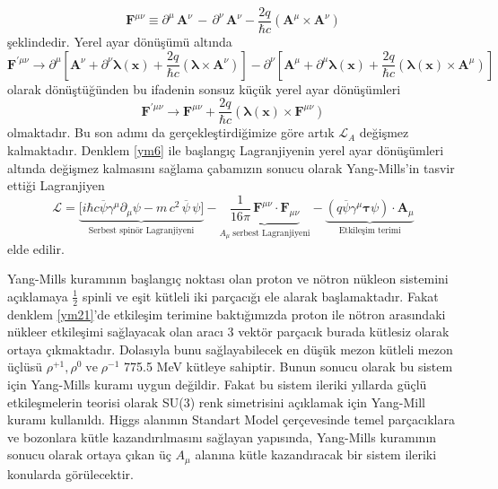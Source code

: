 \begin{equation} \label{ym18}
\mathbf{F}^{\mu\nu} \equiv \partial^{\mu}\,\mathbf{A}^{\nu}\,  - \, \partial^{\nu}\,\mathbf{A}^{\nu} -\frac{2q}{\hbar c}(\mathbf{A}^{\mu} \times \mathbf{A}^{\nu})
\end{equation}
şeklindedir. Yerel ayar dönüşümü altında 
\begin{equation} \label{ym19}
\mathbf{F}^{' \mu\nu} \to \partial^{\mu}\left[\mathbf{A}^{\nu} + \partial^{\nu}\boldsymbol{\lambda(x)} + \frac{2q}{\hbar c}(\boldsymbol{\lambda} \times \mathbf{A}^{\nu})\right] - \partial^{\nu} \left[ \mathbf{A}^{\mu} + \partial^{\mu}\boldsymbol{\lambda(x)} + \frac{2q}{\hbar c}(\boldsymbol{\lambda(x)} \times \mathbf{A}^{\mu})\right]
\end{equation}
olarak dönüştüğünden bu ifadenin sonsuz küçük yerel ayar dönüşümleri 
\begin{equation} \label{ym20}
\mathbf{F}^{' \mu\nu} \to \mathbf{F}^{\mu\nu} + \frac{2q}{\hbar c}(\boldsymbol{\lambda(x)} \times \mathbf{F}^{\mu\nu})
\end{equation}
olmaktadır. Bu son adımı da gerçekleştirdiğimize göre artık $\mathcal{L}_{A}$ değişmez kalmaktadır. Denklem \ref{ym6} ile başlangıç Lagranjiyenin yerel ayar dönüşümleri altında değişmez kalmasını sağlama çabamızın sonucu olarak  Yang-Mills'in tasvir ettiği Lagranjiyen 
\begin{equation} \label{ym21}
\mathcal{L} = \underbrace{ \big[ i\hbar c\overline{\psi}\gamma^{\mu}\partial_{\mu} \psi - m\,c^{2}\,\overline{\psi}\,\psi \big]}_{\textrm{Serbest spinör Lagranjiyeni}} -\underbrace{ \frac{1}{16\pi}\,\mathbf{F}^{\mu\nu}\cdot \mathbf{F}_{\mu\nu} }_{A_{\mu}\;\textrm{serbest Lagranjiyeni}}  - \underbrace{ (q\overline{\psi}\gamma^{\mu}\boldsymbol{\tau}\psi)\cdot\mathbf{A}_{\mu} }_{\textrm{Etkileşim terimi}}
\end{equation}
elde edilir.\par
Yang-Mills kuramının başlangıç noktası olan proton ve nötron  nükleon sistemini açıklamaya $\frac{1}{2}$ spinli ve eşit kütleli iki parçacığı ele alarak başlamaktadır. Fakat denklem \ref{ym21}'de etkileşim terimine baktığımızda proton ile nötron arasındaki nükleer etkileşimi sağlayacak olan aracı 3 vektör parçacık burada kütlesiz olarak ortaya çıkmaktadır. Dolasıyla bunu sağlayabilecek en düşük mezon kütleli mezon üçlüsü  $\rho^{+1},\rho^{0}\; \textrm{ve}\;\rho^{-1}$ 775.5 MeV kütleye sahiptir. Bunun sonucu olarak bu sistem için Yang-Mills kuramı uygun değildir. Fakat bu sistem ileriki yıllarda güçlü etkileşmelerin teorisi olarak SU(3) renk simetrisini açıklamak için Yang-Mill kuramı kullanıldı. Higgs alanının Standart Model çerçevesinde temel parçacıklara ve bozonlara kütle kazandırılmasını sağlayan yapısında, Yang-Mills kuramının sonucu olarak ortaya çıkan üç $A_{\mu}$ alanına kütle kazandıracak bir sistem ileriki konularda görülecektir.
